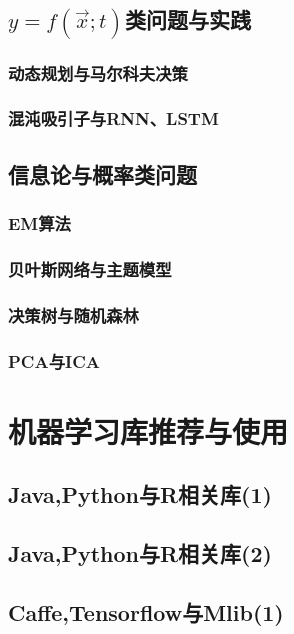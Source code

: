 \documentclass[UTF8]{article}
\begin{document}
		\subsection{$y=f(\vec{x};t)$类问题与实践}
                        \subsubsection{动态规划与马尔科夫决策}

                        \subsubsection{混沌吸引子与RNN、LSTM}

                \subsection{信息论与概率类问题}
                        \subsubsection{EM算法}

                        \subsubsection{贝叶斯网络与主题模型}

                        \subsubsection{决策树与随机森林}

                        \subsubsection{PCA与ICA}

    \section{机器学习库推荐与使用}
        \subsection{Java,Python与R相关库(1)}

        \subsection{Java,Python与R相关库(2)}

        \subsection{Caffe,Tensorflow与Mlib(1)}

\end{document}
